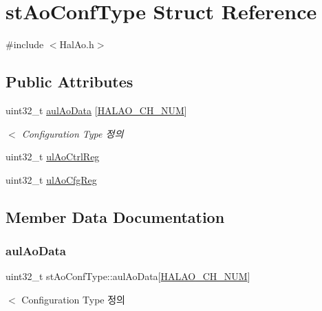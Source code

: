 \hypertarget{structst_ao_conf_type}{}\section{st\+Ao\+Conf\+Type Struct Reference}
\label{structst_ao_conf_type}


{\ttfamily \#include $<$Hal\+Ao.\+h$>$}

\subsection*{Public Attributes}
\begin{DoxyCompactItemize}
\item 
uint32\+\_\+t \mbox{\hyperlink{structst_ao_conf_type_a11067c1f5a7c24f8a8b4664141a9afed}{aul\+Ao\+Data}} \mbox{[}\mbox{\hyperlink{_hal_ao_8h_acb7c64b58e938895c174dd5bc7d84af3}{H\+A\+L\+A\+O\+\_\+\+C\+H\+\_\+\+N\+UM}}\mbox{]}
\begin{DoxyCompactList}\small\item\em $<$ Configuration Type 정의 \end{DoxyCompactList}\item 
uint32\+\_\+t \mbox{\hyperlink{structst_ao_conf_type_ae77c1981ff2c96c6e02af83550f37812}{ul\+Ao\+Ctrl\+Reg}}
\item 
uint32\+\_\+t \mbox{\hyperlink{structst_ao_conf_type_a7691d0a6acb8c052546d274104f902f9}{ul\+Ao\+Cfg\+Reg}}
\end{DoxyCompactItemize}


\subsection{Member Data Documentation}
\mbox{\label{structst_ao_conf_type_a11067c1f5a7c24f8a8b4664141a9afed}} 
\subsubsection{\texorpdfstring{aul\+Ao\+Data}{aulAoData}}
{\footnotesize\ttfamily uint32\+\_\+t st\+Ao\+Conf\+Type\+::aul\+Ao\+Data\mbox{[}\mbox{\hyperlink{_hal_ao_8h_acb7c64b58e938895c174dd5bc7d84af3}{H\+A\+L\+A\+O\+\_\+\+C\+H\+\_\+\+N\+UM}}\mbox{]}}



$<$ Configuration Type 정의 

